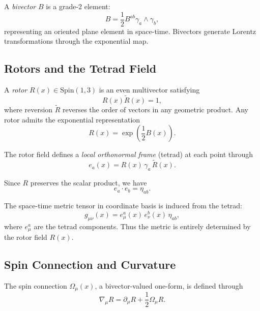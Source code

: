 \documentclass[11pt,a4paper]{article}
\numberwithin{equation}{section}
\theoremstyle{plain}
\theoremstyle{definition}
\theoremstyle{remark}
\begin{document}
A \emph{bivector} $B$ is a grade-2 element:
\begin{equation}
B = \frac{1}{2}B^{ab}\gamma_a \wedge \gamma_b,
\end{equation}
representing an oriented plane element in space-time. Bivectors generate Lorentz transformations through the exponential map.

\subsection{Rotors and the Tetrad Field}

A \emph{rotor} $R(x) \in \mathrm{Spin}(1,3)$ is an even multivector satisfying
\begin{equation}
R(x)\widetilde{R}(x) = 1,
\end{equation}
where reversion $\widetilde{R}$ reverses the order of vectors in any geometric product. Any rotor admits the exponential representation
\begin{equation}
R(x) = \exp\left(\frac{1}{2}B(x)\right).
\label{eq:rotor-exp}
\end{equation}

The rotor field defines a \emph{local orthonormal frame} (tetrad) at each point through
\begin{equation}
e_a(x) = R(x)\, \gamma_a\, \widetilde{R}(x).
\label{eq:tetrad}
\end{equation}

Since $R$ preserves the scalar product, we have
\begin{equation}
e_a \cdot e_b = \eta_{ab}.
\end{equation}

The space-time metric tensor in coordinate basis is induced from the tetrad:
\begin{equation}
g_{\mu\nu}(x) = e_\mu^a(x)\, e_\nu^b(x)\, \eta_{ab},
\label{eq:metric}
\end{equation}
where $e_\mu^a$ are the tetrad components. Thus the metric is entirely determined by the rotor field $R(x)$.

\subsection{Spin Connection and Curvature}

The spin connection $\Omega_\mu(x)$, a bivector-valued one-form, is defined through
\begin{equation}
\nabla_\mu R = \partial_\mu R + \frac{1}{2}\Omega_\mu R.
\label{eq:covariant-deriv}
\end{equation}
\end{document}
